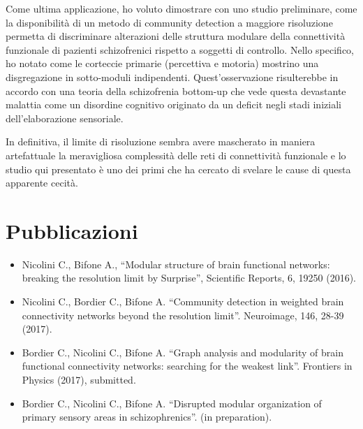 Come ultima applicazione, ho voluto dimostrare con uno studio preliminare, come la disponibilità di un metodo di community detection a maggiore risoluzione permetta di discriminare alterazioni delle struttura modulare della connettività funzionale di pazienti schizofrenici rispetto a soggetti di controllo. Nello specifico, ho notato come le corteccie primarie (percettiva e motoria) mostrino una disgregazione in sotto-moduli indipendenti.
Quest'osservazione risulterebbe in accordo con una teoria della schizofrenia bottom-up che vede questa devastante malattia come un disordine cognitivo originato da un deficit negli stadi iniziali dell'elaborazione sensoriale.

In definitiva, il limite di risoluzione sembra avere mascherato in maniera artefattuale la meravigliosa complessità delle reti di connettività funzionale e lo studio qui presentato è uno dei primi che ha cercato di svelare le cause di questa apparente cecità.

\section*{Pubblicazioni}

\begin{itemize}
	\item Nicolini C., Bifone A., ``Modular structure of brain functional networks: breaking the resolution limit by Surprise'', Scientific Reports, 6, 19250 (2016).
	\item Nicolini C., Bordier C., Bifone A. ``Community detection in weighted brain connectivity networks beyond the resolution limit''. Neuroimage, 146, 28-39 (2017).
	\item Bordier C., Nicolini C., Bifone A. ``Graph analysis and modularity of brain functional connectivity networks: searching for the weakest link''. Frontiers in Physics (2017), submitted.
	\item Bordier C., Nicolini C., Bifone A. ``Disrupted modular organization of primary sensory areas in schizophrenics''. (in preparation).
\end{itemize}

